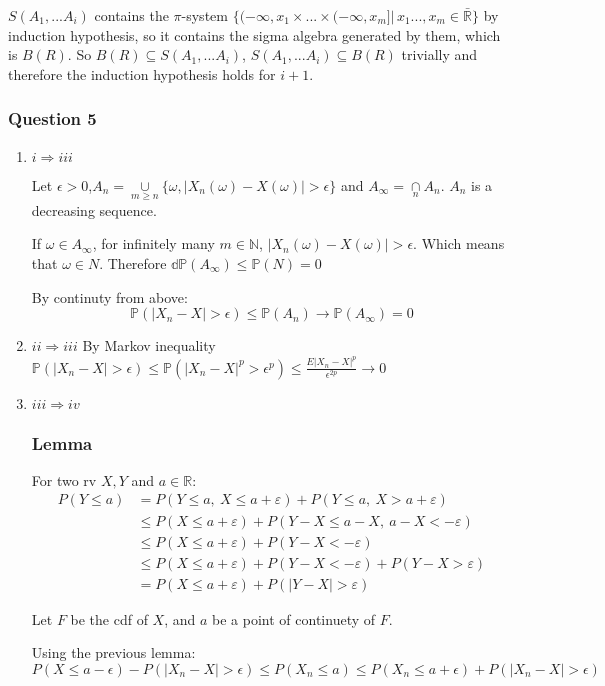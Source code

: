\documentclass[12pt]{article}
\newcommand{\Q}[1]{\subsubsection*{Question #1}}
\newcommand{\union}[1]{\underset{#1}{\cup} }
\newcommand{\inter}[1]{\underset{#1}{\cap} }
\begin{document}
$S(A_1, ... A_i)$ contains the $\pi$-system $\{(-\infty, x_1 \times ... \times (-\infty, x_m] | \, x_1..., x_m \in \mathbb{\bar R} \}$  by induction hypothesis, so it contains the sigma algebra generated by them, which is $B(R)$. So $B(R) \subseteq S(A_1, ... A_i)$, $S(A_1, ... A_i) \subseteq B(R)$ trivially and therefore the induction hypothesis holds for $i+1$.


\Q{5}
\begin{enumerate}
\item $i \Rightarrow iii$

Let $\epsilon > 0$,$A_n = \union{m \geq n} \{ \omega , |X_n(\omega) - X(\omega)| > \epsilon\}$
and $A_{\infty} = \inter{n} A_n$.
$A_n$ is a decreasing sequence.

If $\omega \in A_\infty$, 
for infinitely many $m \in \mathbb{N}$, 
$|X_n(\omega) - X(\omega)| > \epsilon$. 
Which means that $\omega \in N$. Therefore $\mathbb{dP}(A_\infty) \leq \mathbb{P}(N) = 0$


By continuty from above:
$$\mathbb{P}(|X_n - X| > \epsilon) \leq \mathbb{P}(A_n) \rightarrow \mathbb{P}(A_\infty) = 0$$


\item $ii \Rightarrow iii$
By Markov inequality
$\mathbb{P}(|X_n - X| > \epsilon) \leq \mathbb{P}(|X_n - X|^p > \epsilon^p) \leq \frac{E{|X_n - X|^p}}{\epsilon^{2p}} \rightarrow 0$

\item $iii \Rightarrow iv$ 

\subsubsection*{Lemma}

For two rv $X, Y$ and $a \in \mathbb{R}$:
\begin{align}
  P(Y\leq a) &= P(Y\leq a,\ X\leq a+\varepsilon) + P(Y\leq a,\ X>a+\varepsilon) \\
  &\leq P(X\leq a+\varepsilon) + P(Y-X\leq a-X,\ a-X<-\varepsilon) \\
  &\leq P(X\leq a+\varepsilon) + P(Y-X<-\varepsilon) \\
  &\leq P(X\leq a+\varepsilon) + P(Y-X<-\varepsilon) + P(Y-X>\varepsilon)\\
  &= P(X\leq a+\varepsilon) + P(|Y-X|>\varepsilon)
\end{align}


Let $F$ be the cdf of $X$, and $a$ be a point of continuety of $F$.

Using the previous lemma:
$$P(X \leq a- \epsilon) - P(|X_n - X| > \epsilon) \leq P(X_n \leq a) \leq P(X_n \leq a + \epsilon) + P(|X_n - X| > \epsilon)$$



\end{enumerate}
\end{document}

